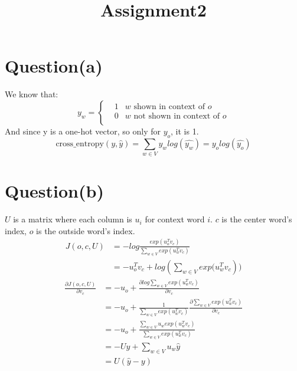 \documentclass[11pt]{article}
\title{Assignment2}
\begin{document}
\maketitle
\section{Question(a)}
We know that:
\begin{equation}
y_w=\left\{\begin{aligned} & 1 &w\text{ shown in context of } o\\
& 0 & w\text{ not shown in context of } o\\
\end{aligned} \right.
\end{equation}
And since y is a one-hot vector, so only for $y_o$, it is 1.
\begin{equation}
\text{cross\_entropy}(y, \hat{y})=\sum_{w \in {V}}y_wlog(\hat{y_w}) = y_olog(\hat{y_o})
\end{equation} 
\section{Question(b)}
$U$ is a matrix where each column is $u_i$ for context word $i$. $c$ is the center word's index, $o$ is the outside word's index.
\begin{equation}
\begin{aligned}
J(o, c, U) &= -log\frac{exp(u_o^Tv_c)}{\sum_{w \in {V}}{exp(u_w^Tv_c)}}\\
&=-u_o^Tv_c + log(\sum_{w \in {V}}{exp(u_w^Tv_c}))
\end{aligned}
\end{equation} 
\begin{equation}
\begin{aligned}
\frac{\partial J(o, c, U)}{\partial v_c} &= -u_o + \frac{\partial log\sum_{w \in V} exp(u_w^Tv_c)}{\partial v_c} \\
&= -u_o + \frac{1}{\sum_{w \in V} exp(u_w^Tv_c)}\frac{\partial{\sum_{w \in V} exp(u_w^Tv_c)}}{\partial v_c}\\ 
&= -u_o + \frac{\sum_{w \in V} u_wexp(u_w^Tv_c)}{\sum_{w \in V} exp(u_w^Tv_c)}\\
&= -Uy + \sum_{w \in V} u_w\hat y\\
&= U(\hat y - y)
\end{aligned}
\end{equation} 
\end{document}

